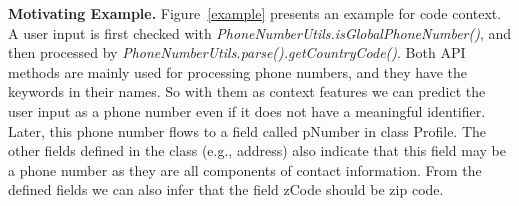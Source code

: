 \textbf{Motivating Example.} Figure~\ref{example} presents an example for code context. A user input is first checked with \textit{PhoneNumberUtils.isGlobalPhoneNumber()}, and then processed by \textit{PhoneNumberUtils.parse().getCountryCode()}. Both API methods are mainly used for processing phone numbers, and they have the keywords in their names. So with them as context features we can predict the user input as a phone number even if it does not have a meaningful identifier. Later, this phone number flows to a field called pNumber in class Profile. The other fields defined in the class (e.g., address) also indicate that this field may be a phone number as they are all components of contact information. From the defined fields we can also infer that the field zCode should be zip code.


